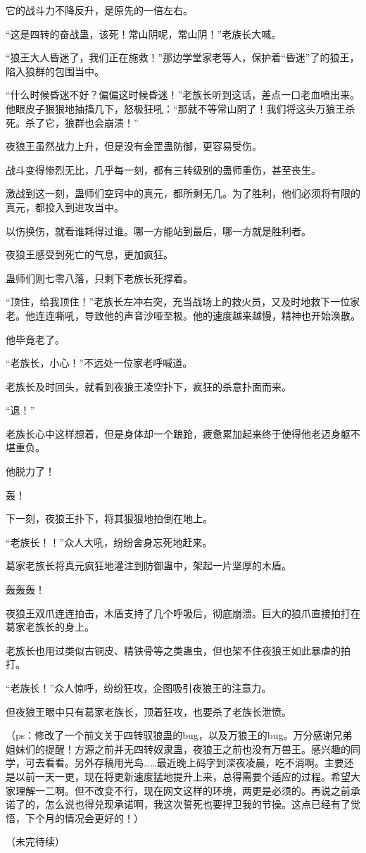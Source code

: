 \begin{this_body}
它的战斗力不降反升，是原先的一倍左右。

“这是四转的奋战蛊，该死！常山阴呢，常山阴！”老族长大喊。

“狼王大人昏迷了，我们正在施救！”那边学堂家老等人，保护着“昏迷”了的狼王，陷入狼群的包围当中。

“什么时候昏迷不好？偏偏这时候昏迷！”老族长听到这话，差点一口老血喷出来。他眼皮子狠狠地抽搐几下，怒极狂吼：“那就不等常山阴了！我们将这头万狼王杀死。杀了它，狼群也会崩溃！”

夜狼王虽然战力上升，但是没有金罡蛊防御，更容易受伤。

战斗变得惨烈无比，几乎每一刻，都有三转级别的蛊师重伤，甚至丧生。

激战到这一刻，蛊师们空窍中的真元，都所剩无几。为了胜利，他们必须将有限的真元，都投入到进攻当中。

以伤换伤，就看谁耗得过谁。哪一方能站到最后，哪一方就是胜利者。

夜狼王感受到死亡的气息，更加疯狂。

蛊师们则七零八落，只剩下老族长死撑着。

“顶住，给我顶住！”老族长左冲右突，充当战场上的救火员，又及时地救下一位家老。他连连嘶吼，导致他的声音沙哑至极。他的速度越来越慢，精神也开始涣散。

他毕竟老了。

“老族长，小心！”不远处一位家老呼喊道。

老族长及时回头，就看到夜狼王凌空扑下，疯狂的杀意扑面而来。

“退！”

老族长心中这样想着，但是身体却一个踉跄，疲惫累加起来终于使得他老迈身躯不堪重负。

他脱力了！

轰！

下一刻，夜狼王扑下，将其狠狠地拍倒在地上。

“老族长！！”众人大吼，纷纷舍身忘死地赶来。

葛家老族长将真元疯狂地灌注到防御蛊中，架起一片坚厚的木盾。

轰轰轰！

夜狼王双爪连连拍击，木盾支持了几个呼吸后，彻底崩溃。巨大的狼爪直接拍打在葛家老族长的身上。

老族长也用过类似古铜皮、精铁骨等之类蛊虫，但也架不住夜狼王如此暴虐的拍打。

“老族长！”众人惊呼，纷纷狂攻，企图吸引夜狼王的注意力。

但夜狼王眼中只有葛家老族长，顶着狂攻，也要杀了老族长泄愤。

（ps：修改了一个前文关于四转驭狼蛊的bug，以及万狼王的bug。万分感谢兄弟姐妹们的提醒！方源之前并无四转奴隶蛊，夜狼王之前也没有万兽王。感兴趣的同学，可去看看。另外存稿用光鸟……最近晚上码字到深夜凌晨，吃不消啊。主要还是以前一天一更，现在将更新速度猛地提升上来，总得需要个适应的过程。希望大家理解一二啊。但不改变不行，现在网文这样的环境，两更是必须的。再说之前承诺了的，怎么说也得兑现承诺啊，我这次誓死也要捍卫我的节操。这点已经有了觉悟，下个月的情况会更好的！）

（未完待续）

\end{this_body}

